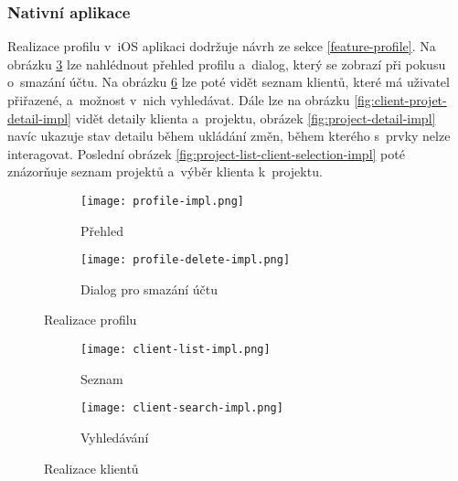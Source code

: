 \subsubsection{Nativní aplikace}

Realizace profilu v~iOS aplikaci dodržuje návrh ze sekce \ref{feature-profile}. Na obrázku \ref{fig:profile-impl} lze nahlédnout přehled profilu a~dialog, který se zobrazí při pokusu o~smazání účtu. Na obrázku \ref{fig:clients-impl} lze poté vidět seznam klientů, které má uživatel přiřazené, a~možnost v~nich vyhledávat. Dále lze na obrázku \ref{fig:client-projet-detail-impl} vidět detaily klienta a~projektu, obrázek \ref{fig:project-detail-impl} navíc ukazuje stav detailu během ukládání změn, během kterého s~prvky nelze interagovat. Poslední obrázek \ref{fig:project-list-client-selection-impl} poté znázorňuje seznam projektů a~výběr klienta k~projektu.

\begin{figure}[p]
    \centering
    \begin{subfigure}[b]{0.4\textwidth}
		\centering
		\texttt{[image: profile-impl.png]}
		\caption{Přehled}
		\label{fig:profile-overview-impl}
	\end{subfigure}
	\hspace{2cm}
	\begin{subfigure}[b]{0.4\textwidth}
		\centering
		\texttt{[image: profile-delete-impl.png]}
		\caption{Dialog pro smazání účtu}
		\label{fig:profile-delete-impl}
	\end{subfigure}
	\caption{Realizace profilu}
	\label{fig:profile-impl}
\end{figure}

\begin{figure}[p]
    \centering
    \begin{subfigure}[b]{0.4\textwidth}
		\centering
		\texttt{[image: client-list-impl.png]}
		\caption{Seznam}
		\label{fig:client-list-impl}
	\end{subfigure}
	\hspace{2cm}
	\begin{subfigure}[b]{0.4\textwidth}
		\centering
		\texttt{[image: client-search-impl.png]}
		\caption{Vyhledávání}
		\label{fig:client-search-impl}
	\end{subfigure}
	\caption{Realizace klientů}
	\label{fig:clients-impl}
\end{figure}

